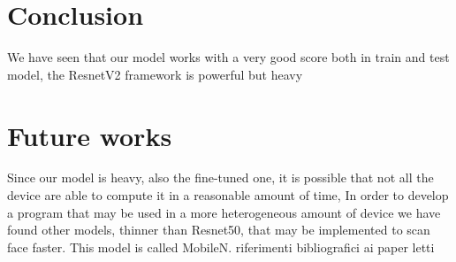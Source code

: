 \section{Conclusion} 

We have seen that our model works with a very good score both in train and test model, the ResnetV2 framework is powerful but heavy
\section{Future works}
Since our model is heavy, also the fine-tuned one, it is possible that not all the device are able to compute it in a reasonable amount of time, In order to develop a program that may be used in a more heterogeneous amount of device we have found other models, thinner than Resnet50, that may be implemented to scan face faster. This model is called MobileN.
riferimenti bibliografici ai paper letti
